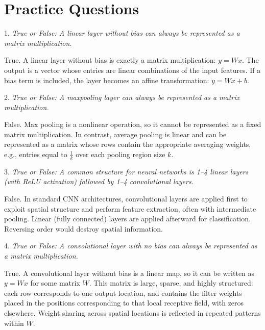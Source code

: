 \section{Practice Questions}

\medskip

1. \textit{True or False: A linear layer without bias can always be represented as a matrix multiplication.}

True. A linear layer without bias is exactly a matrix multiplication: $y = Wx$. The output is a vector whose entries are linear combinations of the input features. If a bias term is included, the layer becomes an affine transformation: $y = Wx + b$.

\vspace{1cm}

2. \textit{True or False: A maxpooling layer can always be represented as a matrix multiplication.}

False. Max pooling is a nonlinear operation, so it cannot be represented as a fixed matrix multiplication. In contrast, average pooling is linear and can be represented as a matrix whose rows contain the appropriate averaging weights, e.g., entries equal to $\frac{1}{k}$ over each pooling region size $k$.

\vspace{1cm}

3. \textit{True or False: A common structure for neural networks is 1–4 linear layers (with ReLU activation) followed by 1–4 convolutional layers.}

False. In standard CNN architectures, convolutional layers are applied first to exploit spatial structure and perform feature extraction, often with intermediate pooling. Linear (fully connected) layers are applied afterward for classification. Reversing order would destroy spatial information.


\vspace{1cm}

4. \textit{True or False: A convolutional layer with no bias can always be represented as a matrix multiplication.}

True. A convolutional layer without bias is a linear map, so it can be written as $y = Wx$ for some matrix $W$. This matrix is large, sparse, and highly structured: each row corresponds to one output location, and contains the filter weights placed in the positions corresponding to that local receptive field, with zeros elsewhere. Weight sharing across spatial locations is reflected in repeated patterns within $W$.


